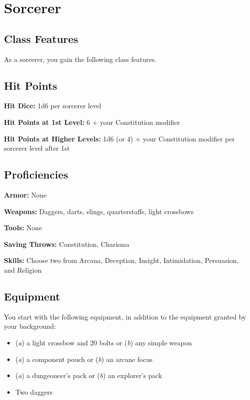 \section{Sorcerer}

\subsection{Class Features}

As a sorcerer, you gain the following class features.

\subsection{Hit Points}

\textbf{Hit Dice:} 1d6 per sorcerer level

\textbf{Hit Points at 1st Level:} 6 + your Constitution modifier

\textbf{Hit Points at Higher Levels:} 1d6 (or 4) + your Constitution modifier per sorcerer level after 1st

\subsection{Proficiencies}

\textbf{Armor:} None

\textbf{Weapons:} Daggers, darts, slings, quarterstaffs, light crossbows

\textbf{Tools:} None

\textbf{Saving Throws:} Constitution, Charisma

\textbf{Skills:} Choose two from Arcana, Deception, Insight, Intimidation, Persuasion, and Religion

\subsection{Equipment}

You start with the following equipment, in addition to the equipment granted by your background:
\begin{itemize}
\item (\textit{a}) a light crossbow and 20 bolts or (\textit{b}) any simple weapon
\item (\textit{a}) a component pouch or (\textit{b}) an arcane focus
\item (\textit{a}) a dungeoneer's pack or (\textit{b}) an explorer's pack
\item Two daggers
\end{itemize}

